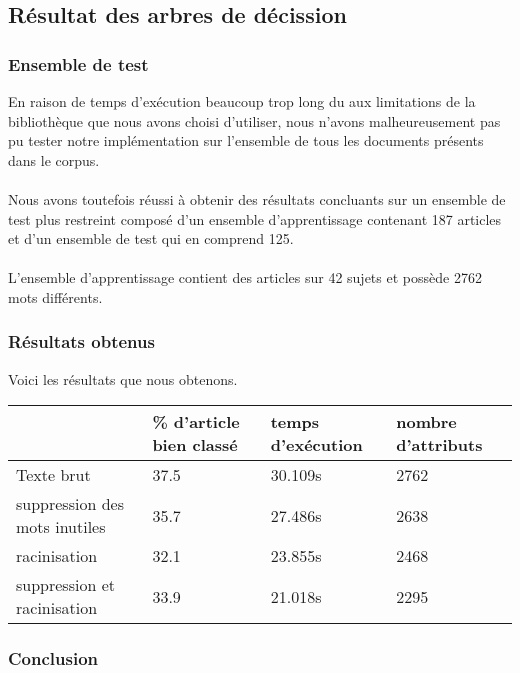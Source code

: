 \subsection{Résultat des arbres de décission}

\subsubsection{Ensemble de test}

En raison de temps d'exécution beaucoup trop long du aux limitations de la bibliothèque que nous avons choisi d'utiliser, nous n’avons malheureusement pas pu tester notre implémentation sur l’ensemble de tous les documents présents dans le corpus.
\paragraph{}
Nous avons toutefois réussi à obtenir des résultats concluants sur un ensemble de test plus restreint composé d’un ensemble d’apprentissage contenant 187 articles et d’un ensemble de test qui en comprend 125.
\paragraph{}
L’ensemble d’apprentissage contient des articles sur 42 sujets et possède 2762 mots différents.

\subsubsection{Résultats obtenus}

Voici les résultats que nous obtenons.

\begin{center}
    \begin{tabular}{| l | p{2cm} | p{2cm} | p{2cm} |}
    \hline
    & \% d'article bien classé & temps d'exécution & nombre d'attributs \\ \hline
    Texte brut & 37.5 & 30.109s & 2762 \\ \hline
    suppression des mots inutiles & 35.7 & 27.486s & 2638 \\ \hline
	racinisation & 32.1 & 23.855s & 2468 \\ \hline
    suppression et racinisation & 33.9 & 21.018s & 2295 \\
    \hline
    \end{tabular}
\end{center}

\subsubsection{Conclusion}

